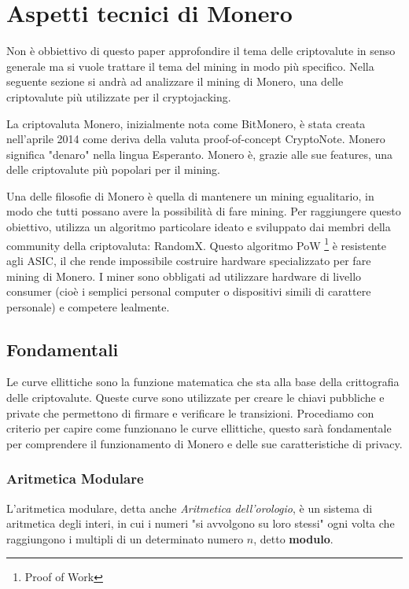 \documentclass[12pt,a4paper]{article}
\begin{document}
\newpage 

\section{Aspetti tecnici di Monero}\label{sec:aspetti_tecnici} Non è obbiettivo
di questo paper approfondire il tema delle criptovalute in senso generale ma si
vuole trattare il tema del mining in modo più specifico. Nella seguente sezione
si andrà ad analizzare il mining di Monero, una delle criptovalute più
utilizzate per il cryptojacking.

La criptovaluta Monero, inizialmente nota come BitMonero, è stata creata
nell'aprile 2014 come deriva della valuta proof-of-concept CryptoNote. Monero
significa "denaro" nella lingua Esperanto. Monero è, grazie alle sue features, una delle criptovalute più popolari per il mining.

Una delle filosofie di Monero è quella di mantenere un mining egualitario, in
modo che tutti possano avere la possibilità di fare mining. Per raggiungere
questo obiettivo, utilizza un algoritmo particolare ideato e sviluppato dai
membri della community della criptovaluta: RandomX. Questo algoritmo PoW
\footnote{Proof of Work} è resistente agli ASIC, il che rende impossibile
costruire hardware specializzato per fare mining di Monero. I miner sono
obbligati ad utilizzare hardware di livello consumer (cioè i semplici personal computer o dispositivi simili di carattere personale) e competere lealmente.

\subsection{Fondamentali}
Le curve ellittiche sono la funzione matematica che sta alla base della
crittografia delle criptovalute. Queste curve sono utilizzate per creare le
chiavi pubbliche e private che permettono di firmare e verificare le
transizioni. Procediamo con criterio per capire come funzionano le curve
ellittiche, questo sarà fondamentale per comprendere il funzionamento di Monero
e delle sue caratteristiche di privacy.

\subsubsection*{Aritmetica Modulare}
L'aritmetica modulare, detta anche \textit{Aritmetica dell'orologio}, è un
sistema di aritmetica degli interi, in cui i numeri "si avvolgono su loro
stessi" ogni volta che raggiungono i multipli di un determinato numero $ n $,
detto \textbf{modulo}.
\end{document}
